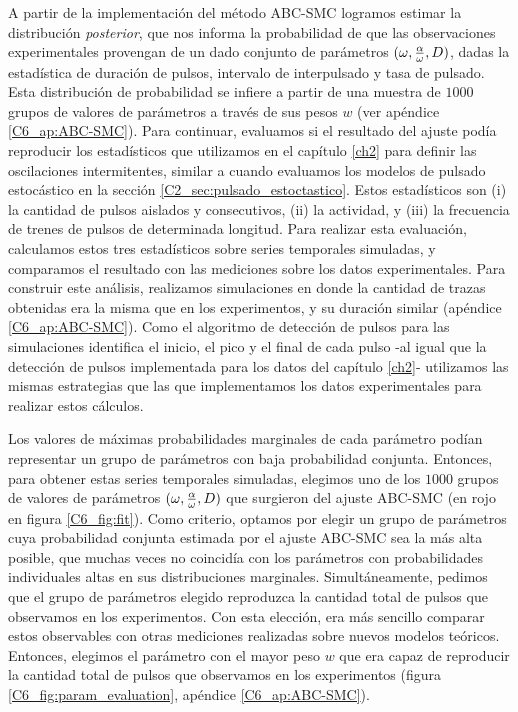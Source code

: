 \documentclass[./main.tex]{subfiles}
\begin{document}
A partir de la implementación del método ABC-SMC logramos estimar la distribución \textit{posterior}, que nos informa la probabilidad de que las observaciones experimentales provengan de un dado conjunto de parámetros $(\omega,\frac{\alpha}{\omega},D)$, dadas la estadística de duración de pulsos, intervalo de interpulsado y tasa de pulsado. Esta distribución de probabilidad se infiere a partir de una muestra de $1000$ grupos de valores de parámetros a través de sus pesos $w$ (ver apéndice \ref{C6_ap:ABC-SMC}). Para continuar, evaluamos si el resultado del ajuste podía reproducir los estadísticos que utilizamos en el capítulo \ref{ch2} para definir las oscilaciones intermitentes, similar a cuando evaluamos los modelos de pulsado estocástico en la sección \ref{C2_sec:pulsado_estoctastico}. Estos estadísticos son (i) la cantidad de pulsos aislados y consecutivos, (ii) la actividad, y (iii) la frecuencia de trenes de pulsos de determinada longitud. Para realizar esta evaluación, calculamos estos tres estadísticos sobre series temporales simuladas, y comparamos el resultado con las mediciones sobre los datos experimentales. Para construir este análisis, realizamos simulaciones en donde la cantidad de trazas obtenidas era la misma que en los experimentos, y su duración similar (apéndice \ref{C6_ap:ABC-SMC}). Como el algoritmo de detección de pulsos para las simulaciones identifica el inicio, el pico y el final de cada pulso -al igual que la detección de pulsos implementada para los datos del capítulo \ref{ch2}- utilizamos las mismas estrategias que las que implementamos los datos experimentales para realizar estos cálculos. 


Los valores de máximas probabilidades marginales de cada parámetro podían representar un grupo de parámetros con baja probabilidad conjunta. Entonces, para obtener estas series temporales simuladas, elegimos uno de los $1000$ grupos de valores de parámetros $(\omega,\frac{\alpha}{\omega},D)$ que surgieron del ajuste ABC-SMC (en rojo en figura \ref{C6_fig:fit}). Como criterio, optamos por elegir un grupo de parámetros cuya probabilidad conjunta estimada por el ajuste ABC-SMC sea la más alta posible, que muchas veces no coincidía con los parámetros con probabilidades individuales altas en sus distribuciones marginales. Simultáneamente, pedimos que el grupo de parámetros elegido reproduzca la cantidad total de pulsos que observamos en los experimentos. Con esta elección, era más sencillo comparar estos observables con otras mediciones realizadas sobre nuevos modelos teóricos. Entonces, elegimos el parámetro con el mayor peso $w$ que era capaz de reproducir la cantidad total de pulsos que observamos en los experimentos (figura \ref{C6_fig:param_evaluation}, apéndice \ref{C6_ap:ABC-SMC}). 
\end{document}
